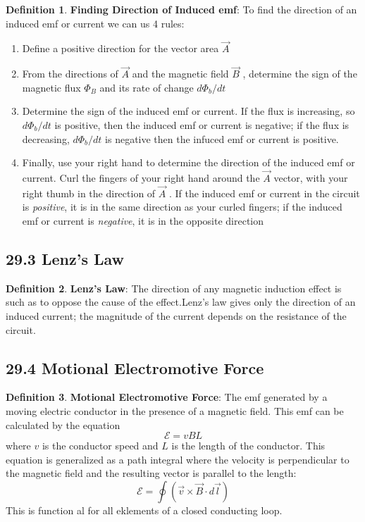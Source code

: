 \documentclass[12pt]{amsart}
\theoremstyle{definition}
\newtheorem{definition}{Definition} %
\numberwithin{equation}{theorem}    %
\begin{document}
\begin{definition}
    \textbf{Finding Direction of Induced emf}:
    To find the direction of an induced emf or current we can us 4 rules:
    \begin{enumerate}
        \item Define a positive direction for the vector area $\vec{A}$
        \item From the directions of $\vec{A}$ and the magnetic field $\vec{B}$ , determine the sign of
        the magnetic flux $\Phi_B$ and its rate of change $d\Phi_b/dt$
        \item Determine the sign of the induced emf or current. If the flux is increasing, so $d\Phi_b/dt$ is positive, then the induced emf or current is negative; if the flux is decreasing, $d\Phi_b/dt$ is negative then the infuced emf or current is positive. 
        \item Finally, use your right hand to determine the direction of the induced emf or current. Curl the fingers of your right hand around the $\vec{A}$ vector, with your right thumb in the direction of $\vec{A}$ . If the induced emf or current in the circuit is \textit{positive}, it is in the same direction as your curled fingers; if the induced emf or current is \textit{negative}, it is in the opposite direction
    \end{enumerate}
\end{definition}

\subsection*{29.3 Lenz's Law}

\begin{definition}
    \textbf{Lenz’s Law}:
    The direction of any magnetic induction effect is such as to oppose the cause of the effect.Lenz’s law gives only the direction of an induced current; the magnitude of the current depends on the resistance of the circuit.
\end{definition}
\subsection*{29.4 Motional Electromotive Force}

\begin{definition}
    \textbf{Motional Electromotive Force}:
    The emf generated by a moving electric conductor in the presence of a magnetic field. This emf can be calculated by the equation $$\mathcal{E} = vBL$$ where $v$ is the conductor speed and $L$ is the length of the conductor.
    This equation is generalized as a path integral where the velocity is perpendicular to the magnetic field and the resulting vector is parallel to the length:
    $$\mathcal{E} = \oint(\vec{v} \times \vec{B} \cdot d\vec{l})$$ This is function al for all eklements of a closed conducting loop.
\end{definition}
\end{document}
